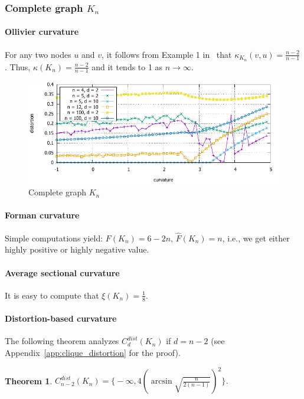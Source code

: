 \documentclass{article} %
\newtheorem{theorem}{Theorem}[section]
\begin{document}
\subsubsection{Complete graph $K_n$}

\paragraph{Ollivier curvature}  
For any two nodes $u$ and $v$, it follows from Example 1 in~\citep{jost2014ollivier} that $\kappa_{K_n}(v, u) = \frac{n-2}{n-1}$. Thus, $\kappa(K_n) = \frac{n-2}{n-1}$ and it tends to 1 as $n \to \infty$.


\begin{figure}
    \centering
    \includegraphics[width = 0.8 \textwidth]{clique_distortion.pdf}
    \caption{Complete graph $K_n$}
    \label{fig:clique}
\end{figure}

\paragraph{Forman curvature} 
Simple computations yield:
$F(K_n) = 6 - 2n$, $\hat{F}(K_n) = n$, i.e., we get either highly positive or highly negative value.

\paragraph{Average sectional curvature} It is easy to compute that
$\xi(K_n) = \frac{1}{8}$.

\paragraph{Distortion-based curvature}

The following theorem analyzes $C_d^{dist}(K_n)$ if $d = n-2$ (see Appendix~\ref{app:clique_distortion} for the proof). 

\begin{theorem}\label{thm:clique_distortion}
$C_{n-2}^{dist}(K_n) = \bigg\{-\infty,  4 \left(\arcsin \sqrt{\frac{n}{2(n-1)}}\right)^2\bigg\}$.
\end{theorem}
\end{document}

